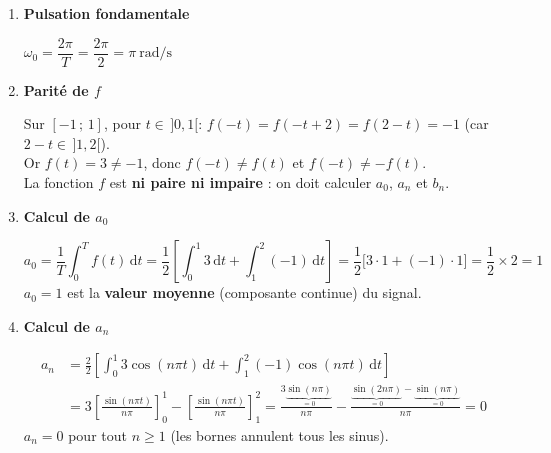 \documentclass[a4paper,11pt]{article}
\begin{document}
\begin{enumerate}[label=\textbf{\arabic*.}]

\item \textbf{Pulsation fondamentale}
\begin{tcolorbox}[corrigebox]
$\omega_0 = \dfrac{2\pi}{T} = \dfrac{2\pi}{2} = \pi\ \text{rad/s}$
\end{tcolorbox}

\item \textbf{Parité de $f$}
\begin{tcolorbox}[corrigebox]
Sur $[-1\,;\,1]$, pour $t\in\,]0,1[$: $f(-t) = f(-t+2) = f(2-t) = -1$ (car $2-t\in\,]1,2[$).\\
Or $f(t) = 3 \neq -1$, donc $f(-t)\neq f(t)$ et $f(-t) \neq -f(t)$.\\
La fonction $f$ est \textbf{ni paire ni impaire} : on doit calculer $a_0$, $a_n$ et $b_n$.
\end{tcolorbox}

\item \textbf{Calcul de $a_0$}
\begin{tcolorbox}[corrigebox]
\[
a_0 = \frac{1}{T}\int_0^T f(t)\,\mathrm{d}t
= \frac{1}{2}\left[\int_0^1 3\,\mathrm{d}t + \int_1^2 (-1)\,\mathrm{d}t\right]
= \frac{1}{2}\bigl[3\cdot 1 + (-1)\cdot 1\bigr] = \frac{1}{2}\times 2 = \boxed{1}
\]
$a_0 = 1$ est la \textbf{valeur moyenne} (composante continue) du signal.
\end{tcolorbox}

\item \textbf{Calcul de $a_n$}
\begin{tcolorbox}[corrigebox]
\begin{align*}
a_n &= \frac{2}{2}\left[\int_0^1 3\cos(n\pi t)\,\mathrm{d}t + \int_1^2 (-1)\cos(n\pi t)\,\mathrm{d}t\right] \\
&= 3\left[\frac{\sin(n\pi t)}{n\pi}\right]_0^1 - \left[\frac{\sin(n\pi t)}{n\pi}\right]_1^2
= \frac{3\underbrace{\sin(n\pi)}_{=0}}{n\pi} - \frac{\underbrace{\sin(2n\pi)}_{=0}-\underbrace{\sin(n\pi)}_{=0}}{n\pi} = 0
\end{align*}
$\boxed{a_n = 0}$ pour tout $n \geq 1$ (les bornes annulent tous les sinus).
\end{tcolorbox}


\end{enumerate}
\end{document}
